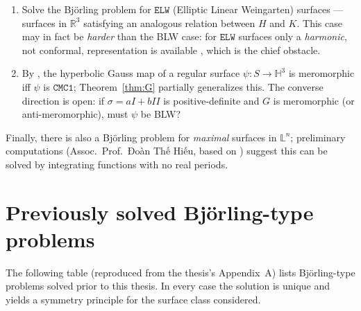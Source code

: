 \documentclass[11pt,a4paper]{article}
\newcommand{\RR}{\mathbb{R}}
\newcommand{\Hyp}{\mathbb{H}^3}                      %
\theoremstyle{plain}
\theoremstyle{definition}
\theoremstyle{remark}
\begin{document}
\begin{enumerate}[label=\arabic*.]
  suitably chosen $V$, there is a unique flat front $\Sigma$ for which
  $\beta$ consists exactly of the singular points of $\Sigma$.
\item Solve the Björling problem for $\mathtt{ELW}$ (Elliptic Linear
  Weingarten) surfaces \cite{GMM6} — surfaces in $\RR^3$ satisfying an
  analogous relation between $H$ and $K$. This case may in fact be
  \emph{harder} than the BLW case: for $\mathtt{ELW}$ surfaces only a
  \emph{harmonic}, not conformal, representation is available
  \cite{GMM6}, which is the chief obstacle.
\item\label{open:G} By \cite{BRYANT,GMM1}, the hyperbolic Gauss map of a
  regular surface $\psi:S\to\Hyp$ is meromorphic iff $\psi$ is
  $\mathtt{CMC1}$; Theorem~\ref{thm:G} partially generalizes this. The
  converse direction is open: if $\sigma=aI+bI\!I$ is positive-definite
  and $G$ is meromorphic (or anti-meromorphic), must $\psi$ be BLW?
\end{enumerate}
Finally, there is also a Björling problem for \emph{maximal} surfaces in
$\mathbb L^n$; preliminary computations (Assoc.\ Prof.\ Đoàn Thế Hiếu,
based on \cite{ACM,AM}) suggest this can be solved by integrating
functions with no real periods.

\appendix
\section{Previously solved Björling-type problems}\label{app:list}

The following table (reproduced from the thesis's Appendix~A) lists
Björling-type problems solved prior to this thesis. In every case the
solution is unique and yields a symmetry principle for the surface class
considered.
\end{document}
